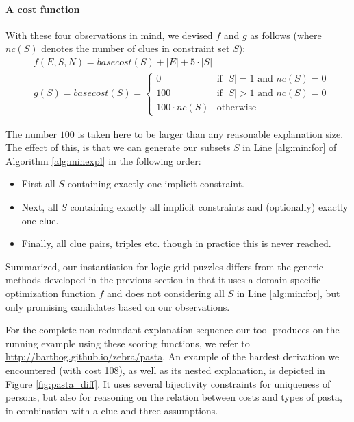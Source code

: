 \paragraph{A cost function}
With these four observations in mind, we devised $f$ and $g$ as follows (where $nc(S)$ denotes the number of clues in constraint set $S$): \label{sec:cost}
\begin{align*} & f(E,S,N) = basecost(S) + |E| + 5\cdot|S|                     \\
     & g(S) = basecost(S) = \left\{\begin{array}{ll}
        0              & \text{if $|S|=1$ and $nc(S) = 0$} \\
        100            & \text{if $|S|>1$ and $nc(S)=0$}   \\
        100\cdot nc(S) & \text{otherwise}
    \end{array}\right.
\end{align*}

The number $100$ is taken here to be larger than any reasonable explanation size.
The effect of this,  is that we can generate our subsets $S$ in Line \ref{alg:min:for}
of Algorithm \ref{alg:minexpl} in the following order:
\begin{itemize}
    \item First all $S$ containing exactly one implicit constraint.
    \item Next, all $S$ containing exactly all implicit constraints and (optionally) exactly one clue.
    \item Finally, all clue pairs, triples etc. though in practice this is never reached.
\end{itemize}
Summarized, our instantiation for logic grid puzzles differs from the generic methods developed in the previous section in that it uses a domain-specific optimization function $f$ and does not considering all $S$ in Line \ref{alg:min:for}, but only promising candidates based on our observations.

For the complete non-redundant explanation sequence our tool produces on the running example using these scoring functions, we refer to \url{http://bartbog.github.io/zebra/pasta}. An example of the hardest derivation we encountered (with cost 108), as well as its nested explanation, is depicted in Figure \ref{fig:pasta_diff}. It uses several bijectivity constraints for uniqueness of persons, but also for reasoning on the relation between costs and types of pasta, in combination with a clue and three assumptions.
